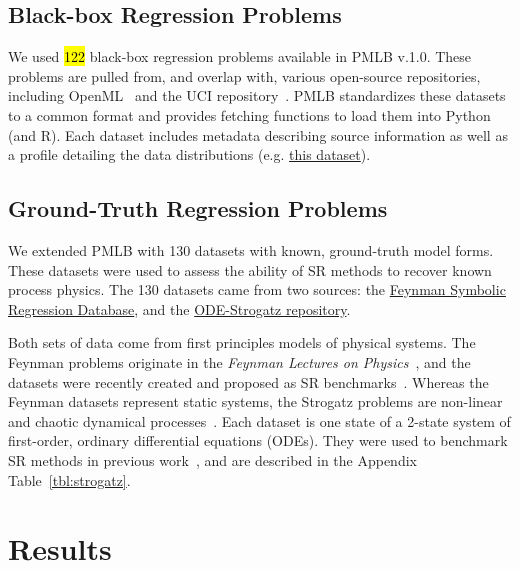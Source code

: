

\subsection{Black-box Regression Problems}

We used \hl{122} black-box regression problems available in PMLB v.1.0. 
These problems are pulled from, and overlap with, various open-source repositories, including OpenML~\cite{vanschorenOpenMLNetworkedScience2013} and the UCI repository~\cite{lichmanUCIMachineLearning2013a}. 
PMLB standardizes these datasets to a common format and provides fetching functions to load them into Python (and R). 
Each dataset includes metadata describing source information as well as a profile detailing the data distributions (e.g. \href{https://epistasislab.github.io/pmlb/profile/analcatdata_aids.html}{this dataset}).

\subsection{Ground-Truth Regression Problems}
We extended PMLB with 130 datasets with known, ground-truth model forms. 
These datasets were used to assess the ability of SR methods to recover known process physics. 
The 130 datasets came from two sources: the \href{https://space.mit.edu/home/tegmark/aifeynman.html}{Feynman Symbolic Regression Database}, 
and the \href{https://github.com/lacava/ode-strogatz}{ODE-Strogatz repository}.

Both sets of data come from first principles models of physical systems. 
The Feynman problems originate in the \textit{Feynman Lectures on Physics}~\cite{feynmanFeynmanLecturesPhysics2015}, and the datasets were recently created and proposed as SR benchmarks~\citet{udrescuAIFeynmanPhysicsInspired2020}. 
Whereas the Feynman datasets represent static systems, the Strogatz problems are non-linear and chaotic dynamical processes~\cite{strogatzNonlinearDynamicsChaos2014}.
Each dataset is one state of a 2-state system of first-order, ordinary differential equations (ODEs). 
They were used to benchmark SR methods in previous work~\cite{lacavaInferenceCompactNonlinear2016,schmidtMachineScienceAutomated2011}, and are described in the Appendix Table~\ref{tbl:strogatz}.

\section{Results}

